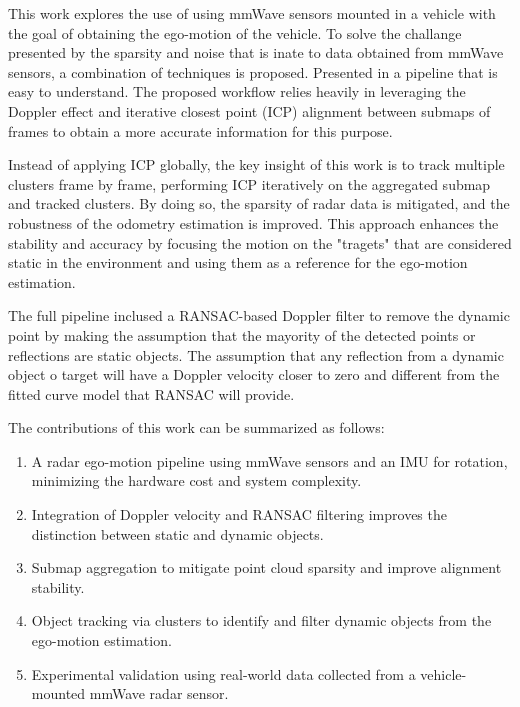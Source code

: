 This work explores the use of using mmWave sensors mounted in a vehicle with the goal of obtaining the ego-motion of the vehicle.
To solve the challange presented by the sparsity and noise that is inate to data obtained from mmWave sensors, a combination of techniques is proposed. 
Presented in a pipeline that is easy to understand.
The proposed workflow relies heavily in leveraging the Doppler effect and iterative closest point (ICP) alignment between submaps of frames to obtain a more accurate information for this purpose.

Instead of applying ICP globally, the key insight of this work is to track multiple clusters frame by frame, performing ICP iteratively on the aggregated submap and tracked clusters. 
By doing so, the sparsity of radar data is mitigated, and the robustness of the odometry estimation is improved.
This approach enhances the stability and accuracy by focusing the motion on the "tragets" that are considered static in the environment and using them as a reference for the ego-motion estimation.

The full pipeline inclused a RANSAC-based Doppler filter to remove the dynamic point by making the assumption that the mayority of the detected points or reflections are static objects. 
The assumption that any reflection from a dynamic object o target will have a Doppler velocity closer to zero and different from the fitted curve model that RANSAC will provide.

The contributions of this work can be summarized as follows:  
\begin{enumerate}
    \item A radar ego-motion pipeline using mmWave sensors and an IMU for rotation, minimizing the hardware cost and system complexity.
    \item Integration of Doppler velocity and RANSAC filtering improves the distinction between static and dynamic objects.
    \item Submap aggregation to mitigate point cloud sparsity and improve alignment stability.
    \item Object tracking via clusters to identify and filter dynamic objects from the ego-motion estimation.
    \item Experimental validation using real-world data collected from a vehicle-mounted mmWave radar sensor.  
\end{enumerate}



